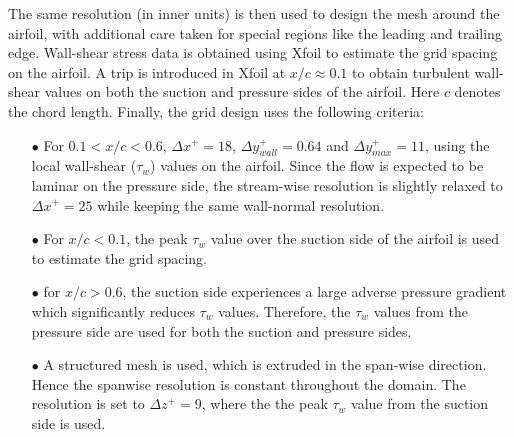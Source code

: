 \documentclass[twocolumn,10pt]{tsfp}
\begin{document}
The same resolution (in inner units) is then used to design the mesh around the airfoil, with additional care taken for special regions like the leading and trailing edge. Wall-shear stress data is obtained using Xfoil to estimate the grid spacing on the airfoil. A trip is introduced in Xfoil at $x/c\approx0.1$ to obtain turbulent wall-shear values on both the suction and pressure sides of the airfoil. Here $c$ denotes the chord length. Finally, the grid design uses the following criteria:

\begin{itemize}
	\item[$\bullet$] For $0.1<x/c<0.6$, $\Delta x^{+}=18$, $\Delta y_{wall}^{+}=0.64$ and $\Delta y_{max}^{+}=11$, using the local wall-shear ($\tau_{w}$) values on the airfoil. Since the flow is expected to be laminar on the pressure side, the stream-wise resolution is slightly relaxed to $\Delta x^{+}=25$ while keeping the same wall-normal resolution.
	\item[$\bullet$] For $x/c<0.1$, the peak $\tau_{w}$ value over the suction side of the airfoil is used to estimate the grid spacing.
	\item [$\bullet$] for $x/c>0.6$, the suction side experiences a large adverse pressure gradient which significantly reduces $\tau_{w}$ values. Therefore, the $\tau_{w}$ values from the pressure side are used for both the suction and pressure sides.
	\item [$\bullet$] A structured mesh is used, which is extruded in the span-wise direction. Hence the spanwise resolution is constant throughout the domain. The resolution is set to $\Delta z^{+}=9$, where the the peak $\tau_{w}$ value from the suction side is used.
\end{itemize}
\end{document}
